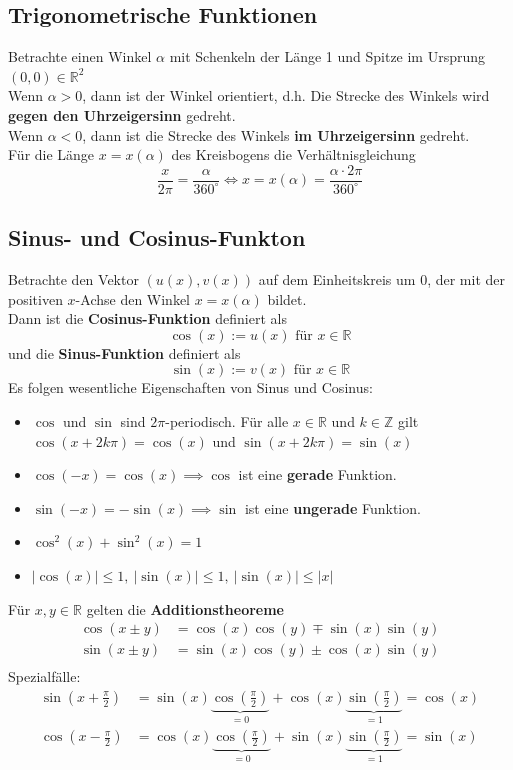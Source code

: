 \documentclass[12pt]{article}
\begin{document}
\subsection{Trigonometrische Funktionen}
Betrachte einen Winkel $\alpha$ mit Schenkeln der Länge 1 und Spitze im Ursprung $(0,0) \in \mathbb{R}^2$ \\
Wenn $\alpha > 0$, dann ist der Winkel orientiert, d.h. Die Strecke des Winkels wird \textbf{gegen den Uhrzeigersinn} gedreht.\\
Wenn $\alpha < 0$, dann ist die Strecke des Winkels \textbf{im Uhrzeigersinn} gedreht. \\
Für die Länge $x = x(\alpha)$ des Kreisbogens die Verhältnisgleichung
\[\frac{x}{2\pi} = \frac{\alpha}{360^{\circ}} \Longleftrightarrow x = x(\alpha) = \frac{\alpha \cdot 2\pi}{360^{\circ}}\]
\subsection{Sinus- und Cosinus-Funkton}
Betrachte den Vektor $(u(x),v(x))$ auf dem Einheitskreis um 0, der mit der positiven $x$-Achse den Winkel $x = x(\alpha)$ bildet. \\
Dann ist die \textbf{Cosinus-Funktion} definiert als
\[\cos(x) := u(x) \text{ für } x \in \mathbb{R}\]
und die \textbf{Sinus-Funktion} definiert als
\[\sin(x) := v(x) \text{ für } x \in \mathbb{R}\]
Es folgen wesentliche Eigenschaften von Sinus und Cosinus:
\begin{itemize}
    \item $\cos$ und $\sin$ sind $2\pi$-periodisch. Für alle $x \in \mathbb{R}$ und $k \in \mathbb{Z}$ gilt $\cos(x+2k\pi) = \cos(x)$ und $\sin(x+2k\pi) = \sin(x)$
    \item $\cos(-x) = \cos(x) \implies \cos$ ist eine \textbf{gerade} Funktion.
    \item $\sin(-x) = -\sin(x) \implies \sin$ ist eine \textbf{ungerade} Funktion.
    \item $\cos^2(x) + \sin^2(x) = 1$
    \item $|\cos(x)| \leq 1, \: |\sin(x)| \leq 1, \: |\sin(x)| \leq |x|$
\end{itemize}
Für $x,y \in \mathbb{R}$ gelten die \textbf{Additionstheoreme} 
\begin{align*}
    \cos(x \pm y) &= \cos(x) \cos(y) \mp \sin(x) \sin(y) \\
    \sin(x \pm y) &= \sin(x) \cos(y) \pm \cos(x) \sin(y) \\
\end{align*}
Spezialfälle:
\begin{align*}
    \sin \left( x + \frac{\pi}{2} \right) &= \sin(x) \underbrace{\cos\left(\frac{\pi}{2}\right)}_{=0} + \cos(x) \underbrace{\sin\left(\frac{\pi}{2}\right)}_{=1} = \cos(x) \\
    \cos \left( x - \frac{\pi}{2} \right) &= \cos(x) \underbrace{\cos\left(\frac{\pi}{2}\right)}_{=0} + \sin(x) \underbrace{\sin\left(\frac{\pi}{2}\right)}_{=1} = \sin(x) 
\end{align*}
\end{document}
